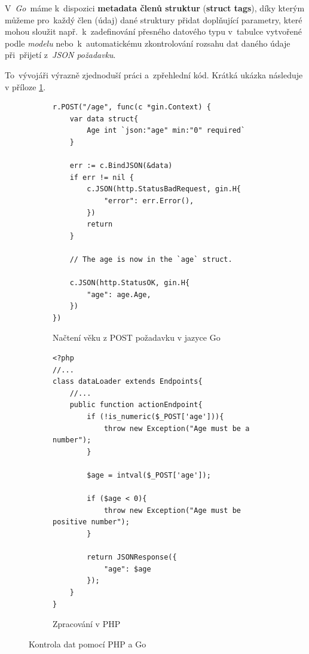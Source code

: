 \documentclass[10pt,a4paper]{article}
\begin{document}
            V~\emph{Go}~máme k~dispozici \textbf{metadata členů struktur} (\textbf{struct tags}), díky kterým můžeme pro~každý člen (údaj) dané struktury přidat doplňující parametry, které mohou sloužit např.~k~zadefinování přesného datového typu v~tabulce vytvořené podle \emph{modelu} nebo~k~automatickému zkontrolování rozsahu dat daného údaje při~přijetí z~\emph{JSON požadavku}.

            To~vývojáři výrazně zjednoduší práci a~zpřehlední kód. Krátká ukázka následuje v příloze \ref{go:structuretags}.

            \begin{figure}
                \begin{subfigure}[b]{0.45\linewidth}
                    \begin{verbatim}
r.POST("/age", func(c *gin.Context) {
    var data struct{
        Age int `json:"age" min:"0" required`
    }

    err := c.BindJSON(&data)
    if err != nil {
        c.JSON(http.StatusBadRequest, gin.H{
            "error": err.Error(),
        })
        return
    }

    // The age is now in the `age` struct.

    c.JSON(http.StatusOK, gin.H{
        "age": age.Age,
    })
})
                    \end{verbatim}
                    \caption{Načtení věku z POST požadavku v jazyce Go}
                \end{subfigure}
                \hfill
                \begin{subfigure}[b]{0.45\linewidth}
                    \begin{verbatim}
<?php
//...
class dataLoader extends Endpoints{
    //...
    public function actionEndpoint{
        if (!is_numeric($_POST['age'])){
            throw new Exception("Age must be a number");
        }

        $age = intval($_POST['age']);

        if ($age < 0){
            throw new Exception("Age must be positive number");
        }

        return JSONResponse({
            "age": $age
        });
    }
}

                    \end{verbatim}
                    \caption{Zpracování v PHP}
                \end{subfigure}
                \caption{Kontrola dat pomocí PHP a Go}
                \label{go:structuretags}
            \end{figure}
            
\end{document}
